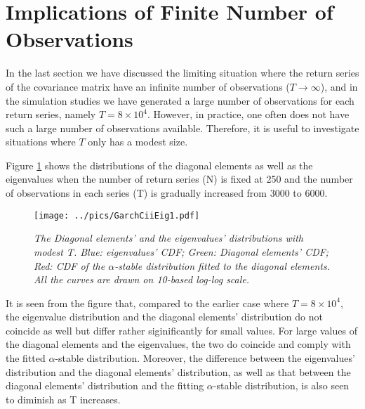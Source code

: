 \documentclass{report}
\begin{document}

\section{Implications of Finite Number of Observations}
In the last section we have discussed the limiting situation where the
return series of the covariance matrix have an infinite number of
observations ($T \to \infty$), and in the simulation studies we have
generated a large number of observations for each return series,
namely $T = 8 \times 10^4$. However, in practice, one often does not
have such a large number of observations available. Therefore, it is
useful to investigate situations where $T$ only has a modest size.

Figure \ref{fig:GarchCiiEig1} shows the distributions of the diagonal
elements as well as the eigenvalues when the number of return series
(N) is fixed at 250 and the number of observations in each series (T)
is gradually increased from 3000 to 6000.
\begin{figure}[htb!]
  \centering
    \texttt{[image: ../pics/GarchCiiEig1.pdf]}
  \caption{\small \it The Diagonal elements' and the eigenvalues'
    distributions with modest T. Blue: eigenvalues' CDF;
    Green: Diagonal elements' CDF; Red: CDF of the $\alpha$-stable
    distribution fitted to the diagonal elements. All the curves are
    drawn on 10-based log-log scale.
  }
  \label{fig:GarchCiiEig1}
\end{figure}
It is seen from the figure that, compared to the earlier case where $T
= 8 \times 10^4$, the eigenvalue distribution and the diagonal
elements' distribution do not coincide as well but differ rather
siginificantly for small values. For large values of the diagonal
elements and the eigenvalues, the two do coincide and comply with the
fitted $\alpha$-stable distribution. Moreover, the difference between
the eigenvalues' distribution and the diagonal elements' distribution,
as well as that between the diagonal elements' distribution and the
fitting $\alpha$-stable distribution, is also seen to diminish as T
increases.
\end{document}
